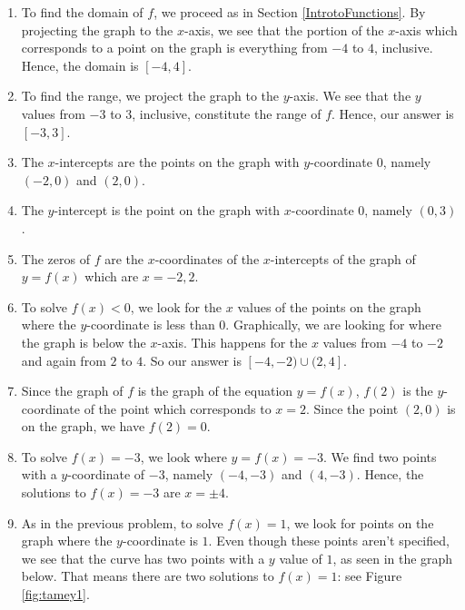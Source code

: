 {
\begin{enumerate}

\item  To find the domain of $f$, we proceed as in Section \ref{IntrotoFunctions}.  By projecting the graph to the $x$-axis, we see that the portion of the $x$-axis which corresponds to a point on the graph is everything from $-4$ to $4$, inclusive.  Hence, the domain is $[-4,4]$.

\item  To find the range, we project the graph to the $y$-axis.  We see that the $y$ values from $-3$ to $3$, inclusive, constitute the range of $f$.  Hence, our answer is $[-3,3]$.

\item  The $x$-intercepts are the points on the graph with $y$-coordinate $0$, namely $(-2,0)$ and $(2,0)$.

\item  The $y$-intercept is the point on the graph with $x$-coordinate $0$, namely $(0,3)$.

\item  The zeros of $f$ are the $x$-coordinates of the $x$-intercepts of the graph of $y=f(x)$ which are $x=-2, 2$.

\item  To solve $f(x) < 0$, we look for the $x$ values of the points on the graph where the $y$-coordinate is less than $0$.  Graphically, we are looking for where the graph is below the $x$-axis.  This happens for the $x$ values from $-4$ to $-2$ and again from $2$ to $4$.  So our answer is $[-4,-2) \cup (2,4]$.

\item  Since the graph of $f$ is the graph of the equation $y=f(x)$, $f(2)$ is the $y$-coordinate of the point which corresponds to $x = 2$.  Since the point $(2,0)$ is on the graph, we have $f(2) = 0$.

\item  To solve $f(x) = -3$, we look where $y = f(x) = -3$.  We find two points with a $y$-coordinate of $-3$, namely $(-4,-3)$ and $(4,-3)$.  Hence, the solutions to $f(x) = -3$ are $x = \pm 4$.



\item As in the previous problem, to solve $f(x)=1$, we look for points on the graph where the $y$-coordinate is $1$.  Even though these points aren't specified, we see that the curve has two points with a $y$ value of $1$, as seen in the graph below.  That means there are two solutions to $f(x) = 1$: see Figure \ref{fig:tamey1}.


\end{enumerate}}
